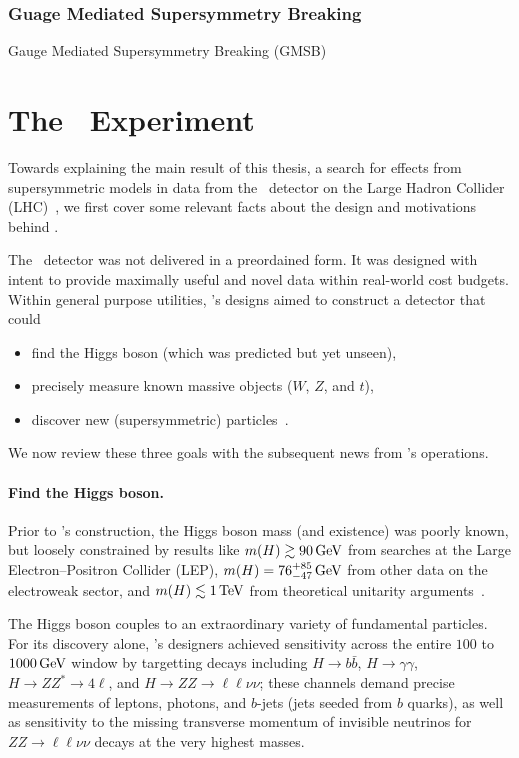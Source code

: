 \subsubsection{Guage Mediated Supersymmetry Breaking}
Gauge Mediated Supersymmetry Breaking (GMSB)


\section{The \atlas\ Experiment}
\label{sec:context_atlas}
Towards explaining the main result of this thesis,
a search for effects from supersymmetric models
in data from the \atlas\ detector
on the Large Hadron Collider (LHC)~\cite{
atlas2022searches,
atlas2008experiment,
lhc2008machine
},
we first cover some relevant facts about the design and motivations
behind \atlas.

The \atlas\ detector was not delivered in a preordained form.
It was designed with intent to provide maximally useful and novel data within
real-world cost budgets.
Within general purpose utilities, \atlas's designs aimed to construct a
detector that could
\begin{itemize}
\item find the Higgs boson (which was predicted but yet unseen),
\item precisely measure known massive objects ($W$, $Z$, and $t$),
\item discover new (supersymmetric) particles~\cite{atlas1999design1}.
\end{itemize}
We now review these three goals with the subsequent news from \atlas's
operations.

\paragraph{Find the Higgs boson.}
Prior to \atlas's construction, the Higgs boson mass (and existence) was
poorly known, but loosely constrained by results like
$m(H) \gtrsim 90\,\eV[G]$ from searches at the
Large Electron–Positron Collider (LEP),
$m(H) = 76^{+85}_{-47}\,\eV[G]$ from other data on the electroweak sector,
and $m(H) \lesssim 1\,\eV[T]$ from theoretical unitarity arguments~\cite{
atlas1999design2,
ghinculov1998perturb,
lep1999ewk
}.

The Higgs boson couples to an extraordinary variety of fundamental particles.
For its discovery alone, \atlas's designers achieved sensitivity across the
entire $100$ to $1000\,\eV[G]$ window by targetting decays including
$H\to b\bar b$,
$H\to \gamma\gamma$,
$H\to ZZ^* \to 4\ell$, and
$H\to ZZ \to \ell\ell\nu\nu$;
these channels demand precise measurements of leptons, photons, and
$b$-jets (jets seeded from $b$ quarks), as well as sensitivity to the missing
transverse momentum of invisible neutrinos for $ZZ \to \ell\ell\nu\nu$ decays
at the very highest masses.

